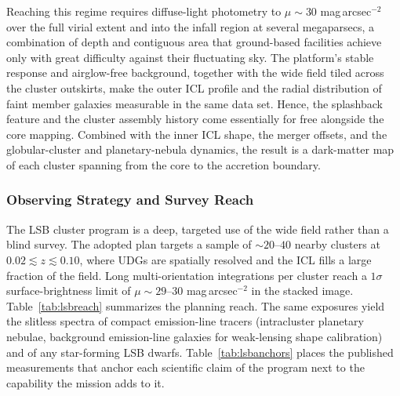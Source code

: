 \documentclass[10pt,onecolumn]{article}
\begin{document}
Reaching this regime requires diffuse-light photometry to $\mu\sim30$ mag\,arcsec$^{-2}$ over the full virial extent and into the infall region at several megaparsecs, a combination of depth and contiguous area that ground-based facilities achieve only with great difficulty against their fluctuating sky. The platform's stable response and airglow-free background, together with the wide field tiled across the cluster outskirts, make the outer ICL profile and the radial distribution of faint member galaxies measurable in the same data set. Hence, the splashback feature and the cluster assembly history come essentially for free alongside the core mapping. Combined with the inner ICL shape, the merger offsets, and the globular-cluster and planetary-nebula dynamics, the result is a dark-matter map of each cluster spanning from the core to the accretion boundary.

\subsubsection{Observing Strategy and Survey Reach}

The LSB cluster program is a deep, targeted use of the wide field rather than a blind survey. The adopted plan targets a sample of $\sim20$--$40$ nearby clusters at $0.02\lesssim z\lesssim0.10$, where UDGs are spatially resolved and the ICL fills a large fraction of the field. Long multi-orientation integrations per cluster reach a $1\sigma$ surface-brightness limit of $\mu\sim29$--$30$ mag\,arcsec$^{-2}$ in the stacked image. Table~\ref{tab:lsbreach} summarizes the planning reach. The same exposures yield the slitless spectra of compact emission-line tracers (intracluster planetary nebulae, background emission-line galaxies for weak-lensing shape calibration) and of any star-forming LSB dwarfs. Table~\ref{tab:lsbanchors} places the published measurements that anchor each scientific claim of the program next to the capability the mission adds to it.
\end{document}
